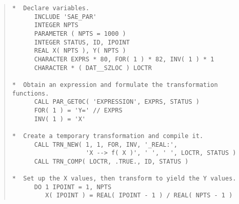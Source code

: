 \begin{quote}
\begin{tabbing} %

\verb#*  Declare variables.                                  #\\
\verb#      INCLUDE 'SAE_PAR'                                #\\
\verb#      INTEGER NPTS                                     #\\
\verb#      PARAMETER ( NPTS = 1000 )                        #\\
\verb#      INTEGER STATUS, ID, IPOINT                       #\\
\verb#      REAL X( NPTS ), Y( NPTS )                        #\\
\verb#      CHARACTER EXPRS * 80, FOR( 1 ) * 82, INV( 1 ) * 1#\\
\verb#      CHARACTER * ( DAT__SZLOC ) LOCTR                 #\\
\verb#                                                       #\\
\verb#*  Obtain an expression and formulate the transformation functions.#\\
\verb#      CALL PAR_GET0C( 'EXPRESSION', EXPRS, STATUS )    #\\
\verb#      FOR( 1 ) = 'Y=' // EXPRS                         #\\
\verb#      INV( 1 ) = 'X'                                   #\\
\verb#                                                       #\\
\verb#*  Create a temporary transformation and compile it.   #\\
\verb#      CALL TRN_NEW( 1, 1, FOR, INV, '_REAL:',          #\\
\verb#                    'X --> f( X )', ' ', ' ', LOCTR, STATUS )#\\
\verb#      CALL TRN_COMP( LOCTR, .TRUE., ID, STATUS )       #\\
\verb#                                                       #\\
\verb#*  Set up the X values, then transform to yield the Y values.#\\
\verb#      DO 1 IPOINT = 1, NPTS                            #\\
\verb#         X( IPOINT ) = REAL( IPOINT - 1 ) / REAL( NPTS - 1 )#\\

\end{tabbing}
\end{quote}
